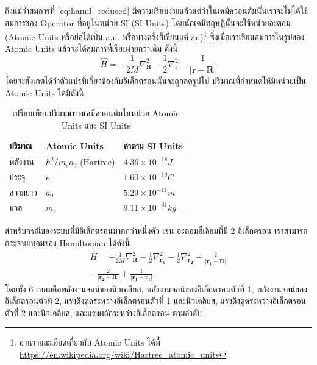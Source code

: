 ถึงแม้ว่าสมการที่ \eqref{eq:hamil_reduced} มีความเรียบง่ายแล้วแต่ว่าในเคมีควอนตัมนั้นเราจะไม่ได้ใช้สมการของ Operator ที่อยู่ในหน่วย SI (SI Units) โดยนักเคมีทฤษฎีนั้นจะใช้หน่วยอะตอม (Atomic Units หรือย่อได้เป็น a.u. หรือบางครั้งก็เขียนแค่ au)\footnote{อ่านรายละเอียดเกี่ยวกับ Atomic Units ได้ที่ \url{https://en.wikipedia.org/wiki/Hartree_atomic_units}} ซึ่งเมื่อเราเขียนสมการในรูปของ Atomic Units แล้วจะได้สมการที่เรียบง่ายกว่าเดิม ดังนี้
%
\begin{equation}\label{eq:hamil_au}
    \hat{H} = -\frac{1}{2M} \nabla^{2}_{\bm{R}}
    -\frac{1}{2} \nabla^{2}_{\bm{r}}
    -\frac{1}{|\bm{r}-\bm{R}|}
\end{equation}
%
\noindent โดยจะสังเกตได้ว่าตัวแปรที่เกี่ยวข้องกับอิเล็กตรอนนั้นจะถูกลดรูปไป ปริมาณที่กำหนดให้มีหน่วยเป็น Atomic Units ได้มีดังนี้

\begin{table}[H]
    \centering
    \caption{เปรียบเทียบปริมาณทางเคมีควอนตัมในหน่วย Atomic Units และ SI Units}
    \label{tab:atomic_units}
    \begin{tabular}{lll}\toprule
        \textbf{ปริมาณ} & \textbf{Atomic Units}             & \textbf{ค่าตาม SI Units}      \\\midrule
        พลังงาน         & $\hbar^{2}/m_{e}a_{0}$ (Hartree) & $4.36 \times 10^{-18} J$  \\
        ประจุ           & $e$                              & $1.60 \times 10^{-19} C$  \\
        ความยาว        & $a_{0}$                          & $5.29 \times 10^{-11} m$  \\
        มวล            & $m_{e}$                          & $9.11 \times 10^{-31} kg$ \\
        \bottomrule
    \end{tabular}
\end{table}

สำหรับกรณีของระบบที่มีอิเล็กตรอนมากกว่าหนึ่งตัว เช่น อะตอมฮีเลียมที่มี 2 อิเล็กตรอน เราสามารถกระจายเทอมของ Hamiltonian ได้ดังนี้
%
\begin{multline}\label{eq:hamil_he_au}
    \hat{H} = -\frac{1}{2M} \nabla^{2}_{\bm{R}}
    -\frac{1}{2} \nabla^{2}_{\bm{r_{1}}}
    -\frac{1}{2} \nabla^{2}_{\bm{r_{2}}}
    -\frac{2}{|\bm{r_{1}}-\bm{R}|}
    \\
    -\frac{2}{|\bm{r_{2}}-\bm{R}|}
    +\frac{1}{|\bm{r_{1}}-\bm{r_{1}}|}
\end{multline}
%
\noindent โดยทั้ง 6 เทอมคือพลังงานจลน์ของนิวเคลียส, พลังงานจลน์ของอิเล็กตรอนตัวที่ 1, พลังงานจลน์ของอิเล็กตรอนตัวที่ 2, แรงดึงดูดระหว่างอิเล็กตรอนตัวที่ 1 และนิวเคลียส, แรงดึงดูดระหว่างอิเล็กตรอนตัวที่ 2 และนิวเคลียส, และแรงผลักระหว่างอิเล็กตรอน ตามลำดับ


